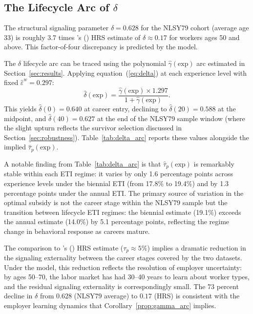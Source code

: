 \documentclass[12pt]{article}
\theoremstyle{definition}
\theoremstyle{remark}
\newcommand{\citepos}[1]{\citeauthor{#1}'s (\citeyear{#1})}
\begin{document}
\subsection{The Lifecycle Arc of $\delta$}

The structural signaling parameter $\hat{\delta} = 0.628$ for the NLSY79 cohort (average
age 33) is roughly 3.7 times \citepos{sztutman2024} HRS estimate of $\delta \approx 0.17$
for workers ages 50 and above. This factor-of-four discrepancy is predicted by the model.

The $\delta$ lifecycle arc can be traced using the polynomial $\hat{\gamma}(\text{exp})$ arc
estimated in Section~\ref{sec:results}. Applying equation~(\ref{eq:delta}) at each experience
level with fixed $\hat{\varepsilon}^w = 0.297$:
\[
\hat{\delta}(\text{exp}) = \frac{\hat{\gamma}(\text{exp}) \times 1.297}{1 + \hat{\gamma}(\text{exp})}.
\]
This yields $\hat{\delta}(0) = 0.640$ at career entry, declining to $\hat{\delta}(20) = 0.588$
at the midpoint, and $\hat{\delta}(40) = 0.627$ at the end of the NLSY79 sample window
(where the slight upturn reflects the survivor selection discussed in Section~\ref{sec:robustness}).
Table~\ref{tab:delta_arc} reports these values alongside the implied $\hat{\tau}_p(\text{exp})$.

A notable finding from Table~\ref{tab:delta_arc} is that $\hat{\tau}_p(\text{exp})$ is
remarkably stable within each ETI regime: it varies by only 1.6 percentage points across
experience levels under the biennial ETI (from 17.8\% to 19.4\%) and by 1.3 percentage
points under the annual ETI. The primary source of variation in the optimal subsidy is not
the career stage within the NLSY79 sample but the transition between lifecycle ETI regimes:
the biennial estimate (19.1\%) exceeds the annual estimate (14.0\%) by 5.1 percentage points,
reflecting the regime change in behavioral response as careers mature.

The comparison to \citepos{sztutman2024} HRS estimate ($\tau_p \approx 5\%$) implies a
dramatic reduction in the signaling externality between the career stages covered by the two
datasets. Under the model, this reduction reflects the resolution of employer uncertainty:
by ages 50--70, the labor market has had 30--40 years to learn about worker types, and the
residual signaling externality is correspondingly small. The 73 percent decline in $\delta$
from $0.628$ (NLSY79 average) to $0.17$ (HRS) is consistent with the employer learning
dynamics that Corollary~\ref{prop:gamma_arc} implies.
\end{document}

